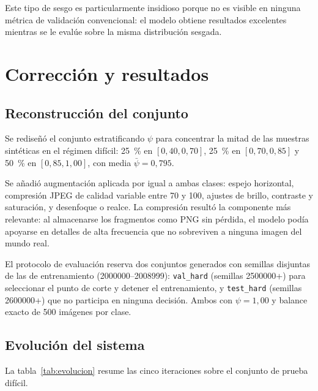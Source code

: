 \documentclass[10pt,twocolumn,letterpaper]{article}
\begin{document}
Este tipo de sesgo es particularmente insidioso porque no es visible en
ninguna métrica de validación convencional: el modelo obtiene resultados
excelentes mientras se le evalúe sobre la misma distribución sesgada.

\section{Corrección y resultados}

\subsection{Reconstrucción del conjunto}

Se rediseñó el conjunto estratificando $\psi$ para concentrar la mitad de
las muestras sintéticas en el régimen difícil:
\SI{25}{\percent} en $[0{,}40, 0{,}70]$,
\SI{25}{\percent} en $[0{,}70, 0{,}85]$ y
\SI{50}{\percent} en $[0{,}85, 1{,}00]$, con media $\bar{\psi}=0{,}795$.

Se añadió augmentación aplicada por igual a ambas clases: espejo
horizontal, compresión JPEG de calidad variable entre 70 y 100, ajustes de
brillo, contraste y saturación, y desenfoque o realce. La compresión resultó
la componente más relevante: al almacenarse los fragmentos como PNG sin
pérdida, el modelo podía apoyarse en detalles de alta frecuencia que no
sobreviven a ninguna imagen del mundo real.

El protocolo de evaluación reserva dos conjuntos generados con semillas
disjuntas de las de entrenamiento (\num{2000000}--\num{2008999}):
\texttt{val\_hard} (semillas \num{2500000}+) para seleccionar el punto de
corte y detener el entrenamiento, y \texttt{test\_hard} (semillas
\num{2600000}+) que no participa en ninguna decisión. Ambos con
$\psi=1{,}00$ y balance exacto de \num{500} imágenes por clase.

\subsection{Evolución del sistema}

La tabla~\ref{tab:evolucion} resume las cinco iteraciones sobre el conjunto
de prueba difícil.
\end{document}
